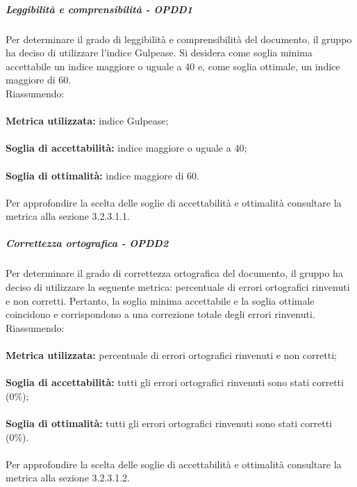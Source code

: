 \documentclass[PianoDiQualifica.tex]{subfiles}
\begin{document}
				\subparagraph{Leggibilità e comprensibilità - OPDD1}
				Per determinare il grado di leggibilità e comprensibilità del documento, il gruppo ha deciso di utilizzare l'indice Gulpease. Si desidera come soglia minima accettabile un indice
				maggiore o uguale a 40 e, come soglia ottimale, un indice maggiore di 60. \\
				Riassumendo: \\ \\
				\textbf{Metrica utilizzata:} indice Gulpease; \\ \\
				\textbf{Soglia di accettabilità:} indice maggiore o uguale a 40; \\ \\
				\textbf{Soglia di ottimalità:} indice maggiore di 60. \\ \\
				Per approfondire la scelta delle soglie di accettabilità e ottimalità consultare la metrica alla sezione 3.2.3.1.1.
				
				\subparagraph{Correttezza ortografica - OPDD2}
				Per determinare il grado di correttezza ortografica del documento, il gruppo ha deciso di utilizzare la seguente metrica: percentuale di errori ortografici rinvenuti e non corretti.
				Pertanto, la soglia minima accettabile e la soglia ottimale coincidono e corrispondono a una correzione totale degli errori rinvenuti. \\
				Riassumendo: \\ \\
				\textbf{Metrica utilizzata:} percentuale di errori ortografici rinvenuti e non corretti; \\ \\
				\textbf{Soglia di accettabilità:} tutti gli errori ortografici rinvenuti sono stati corretti (0\%); \\ \\
				\textbf{Soglia di ottimalità:} tutti gli errori ortografici rinvenuti sono stati corretti (0\%). \\ \\
				Per approfondire la scelta delle soglie di accettabilità e ottimalità consultare la metrica alla sezione 3.2.3.1.2.
				
\end{document}
